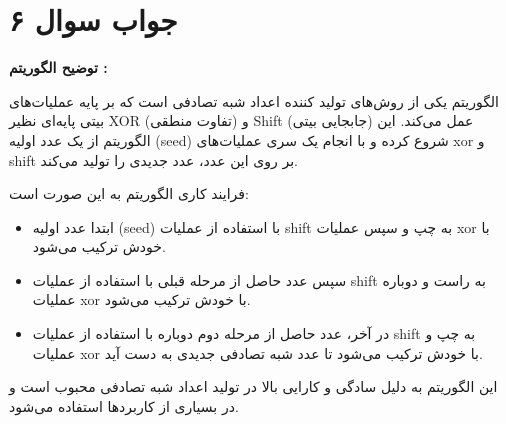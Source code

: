 \section*{جواب سوال ۶}

\textbf{توضیح الگوریتم  :}

الگوریتم  یکی از روش‌های تولید کننده اعداد شبه تصادفی است که بر پایه عملیات‌های بیتی پایه‌ای نظیر XOR (تفاوت منطقی) و Shift (جابجایی بیتی) عمل می‌کند. این الگوریتم از یک عدد اولیه (seed) شروع کرده و با انجام یک سری عملیات‌های xor و shift بر روی این عدد، عدد جدیدی را تولید می‌کند. 

فرایند کاری الگوریتم به این صورت است:
\begin{itemize}
	\item ابتدا عدد اولیه (seed) با استفاده از عملیات shift به چپ و سپس عملیات xor با خودش ترکیب می‌شود.
	\item سپس عدد حاصل از مرحله قبلی با استفاده از عملیات shift به راست و دوباره عملیات xor با خودش ترکیب می‌شود.
	\item در آخر، عدد حاصل از مرحله دوم دوباره با استفاده از عملیات shift به چپ و عملیات xor با خودش ترکیب می‌شود تا عدد شبه تصادفی جدیدی به دست آید.
\end{itemize}

این الگوریتم به دلیل سادگی و کارایی بالا در تولید اعداد شبه تصادفی محبوب است و در بسیاری از کاربردها استفاده می‌شود.